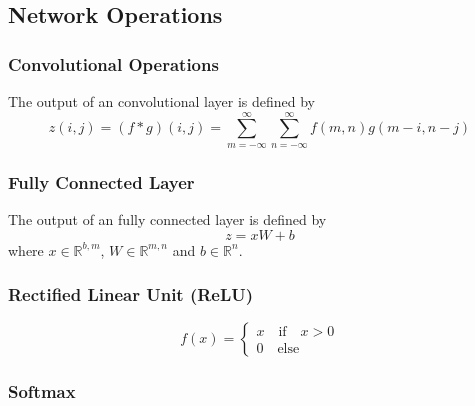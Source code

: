 \subsection*{Network Operations}
\subsubsection*{Convolutional Operations}

The output of an convolutional layer is defined by
\begin{equation}
   z(i,j) = (f*g)(i,j) = \sum_{m=-\infty}^{\infty} \sum_{n=-\infty}^{\infty} f(m,n) g(m-i,n-j)
\end{equation}


\subsubsection*{Fully Connected Layer}

The output of an fully connected layer is defined by
\begin{equation}
	z = xW + b
\end{equation}
where $x \in \mathbb{R}^{b,m}$,  $W \in \mathbb{R}^{m,n}$ and $b \in \mathbb{R}^{n}$. 

\subsubsection*{Rectified Linear Unit (ReLU)}

\begin{equation}
	f(x) = \begin{cases}
		x \quad \text{if} \quad x > 0 \\
		0 \quad \text{else}
	\end{cases}
\end{equation}


\subsubsection*{Softmax}
